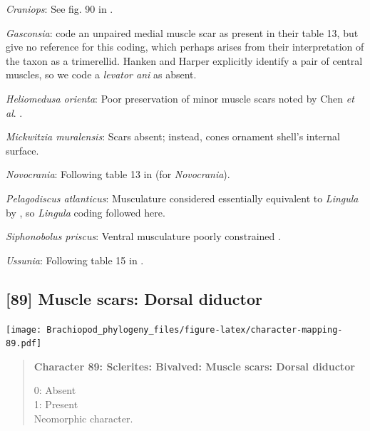\documentclass[openany]{book}
\begin{document}
\hypertarget{Craniops-coding-88}{}
\emph{Craniops}: See fig. 90 in
\citet{Williams2000LinguliformeaCraniiformea}.

\hypertarget{Gasconsia-coding-88}{}
\emph{Gasconsia}: \citet{Williams2000LinguliformeaCraniiformea} code an
unpaired medial muscle scar as present in their table 13, but give no
reference for this coding, which perhaps arises from their
interpretation of the taxon as a trimerellid. Hanken and Harper
\citeyearpar[p.~249 and text-fig. 2]{Hanken1985Thetaxonomy} explicitly
identify a pair of central muscles, so we code a \emph{levator ani} as
absent.

\hypertarget{Heliomedusa_orienta-coding-88}{}
\emph{Heliomedusa orienta}: Poor preservation of minor muscle scars
noted by Chen \emph{et al}. \citeyearpar{Chen2007Reinterpretationof}.

\hypertarget{Mickwitzia_muralensis-coding-88}{}
\emph{Mickwitzia muralensis}: Scars absent; instead, cones ornament
shell's internal surface.

\hypertarget{Novocrania-coding-88}{}
\emph{Novocrania}: Following table 13 in
\citet{Williams2000LinguliformeaCraniiformea} (for \emph{Novocrania}).

\hypertarget{Pelagodiscus_atlanticus-coding-88}{}
\emph{Pelagodiscus atlanticus}: Musculature considered essentially
equivalent to \emph{Lingula} by
\citet{Williams2000LinguliformeaCraniiformea}, so \emph{Lingula} coding
followed here.

\hypertarget{Siphonobolus_priscus-coding-88}{}
\emph{Siphonobolus priscus}: Ventral musculature poorly constrained
\citep{Williams2000LinguliformeaCraniiformea, Popov2009Earlyontogeny}.

\hypertarget{Ussunia-coding-88}{}
\emph{Ussunia}: Following table 15 in
\citet{Williams2000LinguliformeaCraniiformea}.

\subsection*{{[}89{]} Muscle scars: Dorsal
diductor}\label{muscle-scars-dorsal-diductor}

\texttt{[image: Brachiopod\_phylogeny\_files/figure-latex/character-mapping-89.pdf]}

\begin{quote}
\textbf{Character 89: Sclerites: Bivalved: Muscle scars: Dorsal
diductor}

0: Absent\\
1: Present\\
Neomorphic character.
\end{quote}
\end{document}
